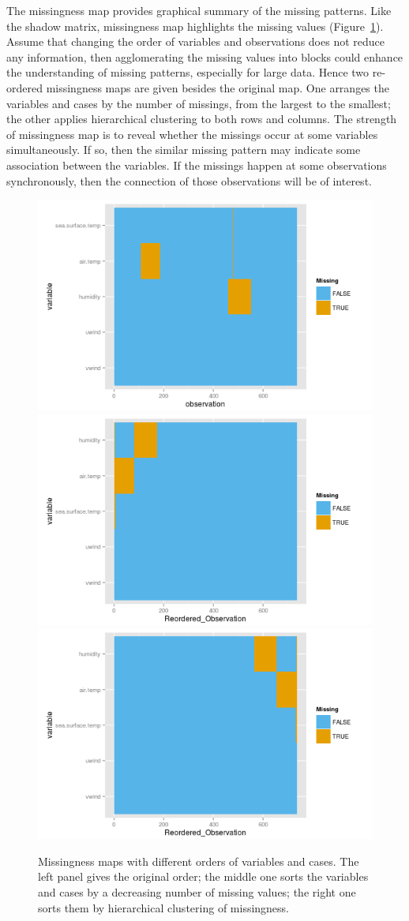 \documentclass[article]{jss}
\begin{document}
The missingness map provides graphical summary of the missing patterns. Like the shadow matrix, missingness map highlights the missing values (Figure~\ref{fig:missingmap}). Assume that changing the order of variables and observations does not reduce any information, then agglomerating the missing values into blocks could enhance the understanding of missing patterns, especially for large data. Hence two re-ordered missingness maps are given besides the original map. One arranges the variables and cases by the number of missings, from the largest to the smallest; the other applies hierarchical clustering to both rows and columns. The strength of missingness map is to reveal whether the missings occur at some variables simultaneously. If so, then the similar missing pattern may indicate some association between the variables. If the missings happen at some observations synchronously, then the connection of those observations will be of interest.

\begin{center}
\begin{figure}[h]
\begin{centering}
\includegraphics[width=.32\textwidth]{graph/fig5-3-map-1}
\includegraphics[width=.32\textwidth]{graph/fig5-3-map-2}
\includegraphics[width=.32\textwidth]{graph/fig5-3-map-3}
\par\end{centering}
\caption{Missingness maps with different orders of variables and cases. The left panel gives the original order; the middle one sorts the variables and cases by a decreasing number of missing values; the right one sorts them by hierarchical clustering of missingness.}
\label{fig:missingmap}
\end{figure}
\par\end{center}
\end{document}
